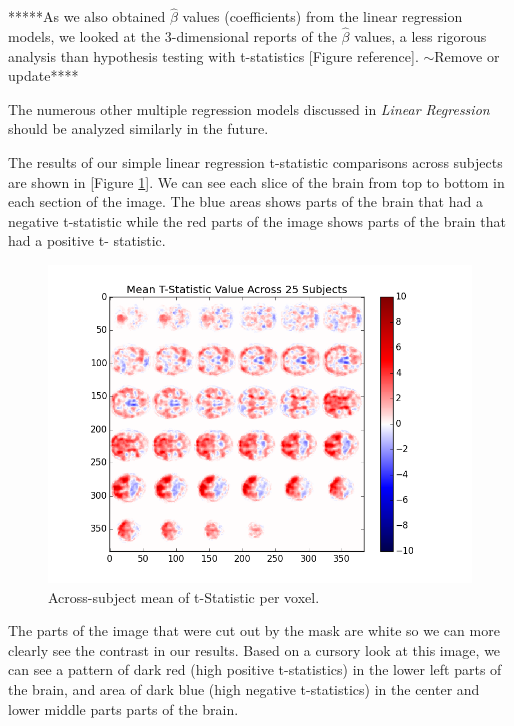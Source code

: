 *****As we also obtained $\hat{\beta}$ values (coefficients) from the linear 
regression models, we looked at the 3-dimensional reports of the 
$\hat{\beta}$ values, a less rigorous analysis than hypothesis testing with 
t-statistics [Figure reference]. $\sim$Remove or update****



The numerous other multiple regression models discussed in 
\textit{Linear Regression} should be analyzed similarly in the future. 



\par \indent The results of our simple linear regression t-statistic 
comparisons across subjects are shown in [Figure \ref{fig:ht}]. We can see 
each slice of the brain from top to bottom in each section of the image. The 
blue areas shows parts of the brain that had a negative t-statistic while the 
red parts of the image shows parts of the brain that had a positive t-
statistic.

\begin{figure}[ht] \centering
\includegraphics[scale=0.5]{../images/hypothesis_testing} \caption{Across-subject 
mean of t-Statistic per voxel.} \label{fig:ht} \end{figure}

\par The parts of the image that were cut out by the mask are white so we can 
more clearly see the contrast in our results. Based on a cursory look at this 
image, we can see a pattern of dark red (high positive t-statistics) in the lower 
left parts of the brain, and area of dark blue (high negative t-statistics) in 
the center and lower middle parts parts of the brain.


